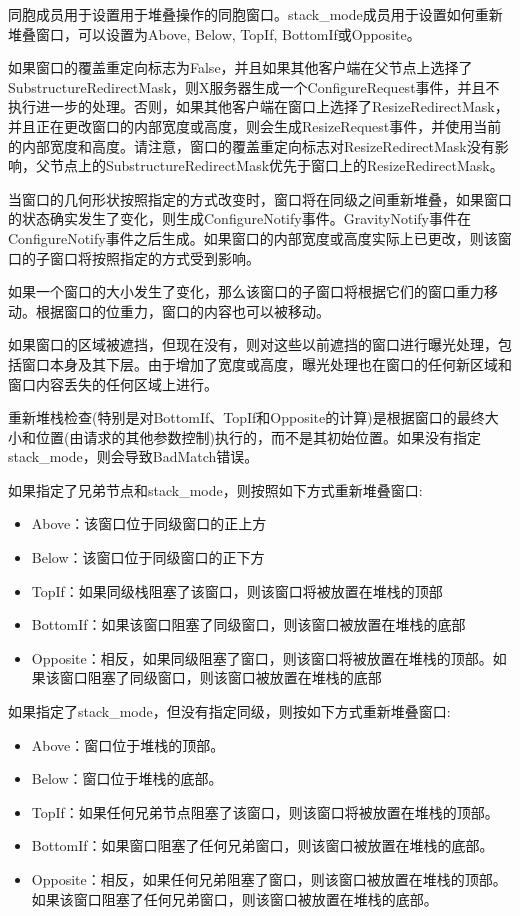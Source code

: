 同胞成员用于设置用于堆叠操作的同胞窗口。stack\_mode成员用于设置如何重新堆叠窗口，可以设置为Above, Below, TopIf, BottomIf或Opposite。

如果窗口的覆盖重定向标志为False，并且如果其他客户端在父节点上选择了SubstructureRedirectMask，则X服务器生成一个ConfigureRequest事件，并且不执行进一步的处理。否则，如果其他客户端在窗口上选择了ResizeRedirectMask，并且正在更改窗口的内部宽度或高度，则会生成ResizeRequest事件，并使用当前的内部宽度和高度。请注意，窗口的覆盖重定向标志对ResizeRedirectMask没有影响，父节点上的SubstructureRedirectMask优先于窗口上的ResizeRedirectMask。

当窗口的几何形状按照指定的方式改变时，窗口将在同级之间重新堆叠，如果窗口的状态确实发生了变化，则生成ConfigureNotify事件。GravityNotify事件在ConfigureNotify事件之后生成。如果窗口的内部宽度或高度实际上已更改，则该窗口的子窗口将按照指定的方式受到影响。

如果一个窗口的大小发生了变化，那么该窗口的子窗口将根据它们的窗口重力移动。根据窗口的位重力，窗口的内容也可以被移动。

如果窗口的区域被遮挡，但现在没有，则对这些以前遮挡的窗口进行曝光处理，包括窗口本身及其下层。由于增加了宽度或高度，曝光处理也在窗口的任何新区域和窗口内容丢失的任何区域上进行。

重新堆栈检查(特别是对BottomIf、TopIf和Opposite的计算)是根据窗口的最终大小和位置(由请求的其他参数控制)执行的，而不是其初始位置。如果没有指定stack\_mode，则会导致BadMatch错误。

\noindent 如果指定了兄弟节点和stack\_mode，则按照如下方式重新堆叠窗口:

\begin{itemize}
	\item Above：该窗口位于同级窗口的正上方
	\item Below：该窗口位于同级窗口的正下方
	\item TopIf：如果同级栈阻塞了该窗口，则该窗口将被放置在堆栈的顶部
	\item BottomIf：如果该窗口阻塞了同级窗口，则该窗口被放置在堆栈的底部
	\item Opposite：相反，如果同级阻塞了窗口，则该窗口将被放置在堆栈的顶部。如果该窗口阻塞了同级窗口，则该窗口被放置在堆栈的底部
\end{itemize}

如果指定了stack\_mode，但没有指定同级，则按如下方式重新堆叠窗口:

\begin{itemize}
	\item Above：窗口位于堆栈的顶部。
	\item Below：窗口位于堆栈的底部。
	\item TopIf：如果任何兄弟节点阻塞了该窗口，则该窗口将被放置在堆栈的顶部。
	\item BottomIf：如果窗口阻塞了任何兄弟窗口，则该窗口被放置在堆栈的底部。
	\item Opposite：相反，如果任何兄弟阻塞了窗口，则该窗口被放置在堆栈的顶部。如果该窗口阻塞了任何兄弟窗口，则该窗口被放置在堆栈的底部。
\end{itemize}

